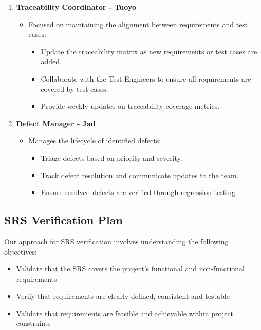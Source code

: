 \documentclass[12pt, titlepage]{article}
\begin{document}
\begin{enumerate}
    \item \textbf{Traceability Coordinator - Tuoyo}
          \begin{itemize}
              \item Focused on maintaining the alignment between requirements and test cases:
                    \begin{itemize}
                        \item Update the traceability matrix as new requirements or test cases are added.
                        \item Collaborate with the Test Engineers to ensure all requirements are covered by test cases.
                        \item Provide weekly updates on traceability coverage metrics.
                    \end{itemize}
          \end{itemize}

    \item \textbf{Defect Manager - Jad}
          \begin{itemize}
              \item Manages the lifecycle of identified defects:
                    \begin{itemize}
                        \item Triage defects based on priority and severity.
                        \item Track defect resolution and communicate updates to the team.
                        \item Ensure resolved defects are verified through regression testing.
                    \end{itemize}
          \end{itemize}
\end{enumerate}

\subsection{SRS Verification Plan}

\noindent Our approach for SRS verification involves understanding the following objectives:

\begin{itemize}
    \item Validate that the SRS covers the project’s functional and non-functional requirements
    \item Verify that requirements are clearly defined, consistent and testable
    \item Validate that requirements are feasible and achievable within project constraints
\end{itemize}
\end{document}

